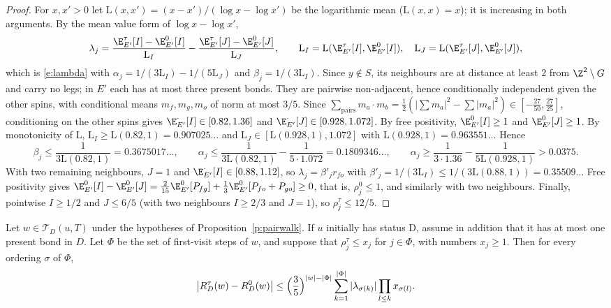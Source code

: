 \begin{proof}
For $x, x' > 0$ let $\mathrm L(x, x') = (x - x')/(\log x - \log x')$ be the logarithmic mean ($\mathrm L(x, x) = x$); it is increasing in both arguments. By the mean value form of $\log x - \log x'$,
\begin{equation*}
\lambda_j = \frac{\E^\tau_{E'}[I] - \E^0_{E'}[I]}{\mathrm L_I} - \frac{\E^\tau_{E'}[J] - \E^0_{E'}[J]}{\mathrm L_J}, \qquad \mathrm L_I = \mathrm L(\E^\tau_{E'}[I], \E^0_{E'}[I]), \quad \mathrm L_J = \mathrm L(\E^\tau_{E'}[J], \E^0_{E'}[J]),
\end{equation*}
which is \eqref{e:lambda} with $\alpha_j = 1/(3 \mathrm L_I) - 1/(5 \mathrm L_J)$ and $\beta_j = 1/(3 \mathrm L_I)$. Since $y \notin S$, its neighbours are at distance at least $2$ from $\Z^2 \setminus G$ and carry no legs; in $E'$ each has at most three present bonds. They are pairwise non-adjacent, hence conditionally independent given the other spins, with conditional means $m_f, m_g, m_o$ of norm at most $3/5$. Since $\sum_{\text{pairs}} m_a \cdot m_b = \frac12 (|\sum m_a|^2 - \sum |m_a|^2) \in [-\frac{27}{50}, \frac{27}{25}]$, conditioning on the other spins gives $\E^\cdot_{E'}[I] \in [0.82, 1.36]$ and $\E^\cdot_{E'}[J] \in [0.928, 1.072]$. By free positivity, $\E^0_{E'}[I] \ge 1$ and $\E^0_{E'}[J] \ge 1$. By monotonicity of $\mathrm L$, $\mathrm L_I \ge \mathrm L(0.82, 1) = 0.907025\ldots$ and $\mathrm L_J \in [\mathrm L(0.928, 1), 1.072]$ with $\mathrm L(0.928, 1) = 0.963551\ldots$ Hence
\begin{equation*}
\beta_j \le \frac{1}{3 \mathrm L(0.82, 1)} = 0.3675017\ldots, \qquad \alpha_j \le \frac{1}{3 \mathrm L(0.82, 1)} - \frac{1}{5 \cdot 1.072} = 0.1809346\ldots, \qquad \alpha_j \ge \frac{1}{3 \cdot 1.36} - \frac{1}{5 \mathrm L(0.928, 1)} > 0.0375 .
\end{equation*}
With two remaining neighbours, $J = 1$ and $\E^\cdot_{E'}[I] \in [0.88, 1.12]$, so $\lambda_j = \beta'_j r_{fo}$ with $\beta'_j = 1/(3 \mathrm L_I) \le 1/(3 \mathrm L(0.88, 1)) = 0.35509\ldots$ Free positivity gives $\E^0_{E'}[I] - \E^0_{E'}[J] = \frac2{15} \E^0_{E'}[P_{fg}] + \frac13 \E^0_{E'}[P_{fo} + P_{go}] \ge 0$, that is, $\rho^0_j \le 1$, and similarly with two neighbours. Finally, pointwise $I \ge 1/2$ and $J \le 6/5$ (with two neighbours $I \ge 2/3$ and $J = 1$), so $\rho^\tau_j \le 12/5$.
\end{proof}

\begin{lemma}\label{l:exposure}
Let $w\in\mathcal T_D(u,T)$ under the hypotheses of
Proposition~\ref{p:pairwalk}. If $u$ initially has status $\mathrm D$,
assume in addition that it has at most one present bond in $D$.
Let $\Phi$ be the set of first-visit steps of $w$, and suppose that
$\rho^\tau_j\le x_j$ for $j\in\Phi$, with numbers $x_j\ge1$.
Then for every ordering $\sigma$ of $\Phi$,
\begin{equation}\label{e:exposure}
\bigl| R^\tau_D(w) - R^0_D(w) \bigr| \le \Bigl( \frac35 \Bigr)^{|w| - |\Phi|} \sum_{k = 1}^{|\Phi|} |\lambda_{\sigma(k)}| \prod_{l \le k} x_{\sigma(l)} .
\end{equation}
\end{lemma}

